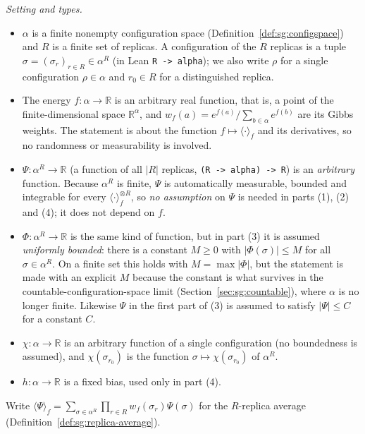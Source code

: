 \begin{lemma}\label{lem:sg:replicacalc}
  \leanok
\emph{Setting and types.}
\begin{itemize}
\item $\alpha$ is a finite nonempty configuration space (Definition~\ref{def:sg:configspace}) and $R$ is a finite set of
  replicas. A configuration of the $R$ replicas is a tuple $\sigma=(\sigma_r)_{r\in R}\in\alpha^R$ (in Lean
  \texttt{R -> alpha}); we also write $\rho$ for a single configuration $\rho\in\alpha$ and $r_0\in R$ for a distinguished replica.
\item The energy $f:\alpha\to\mathbb R$ is an arbitrary real function, that is, a point of the finite-dimensional space
  $\mathbb R^\alpha$, and $w_f(a)=e^{f(a)}/\sum_{b\in\alpha}e^{f(b)}$ are its Gibbs weights. The statement is about the
  function $f\mapsto\langle\cdot\rangle_f$ and its derivatives, so no randomness or measurability is involved.
\item $\Psi:\alpha^R\to\mathbb R$ (a function of all $|R|$ replicas, \texttt{(R -> alpha) -> R}) is an \emph{arbitrary} function.
  Because $\alpha^R$ is finite, $\Psi$ is automatically measurable, bounded and integrable for every
  $\langle\cdot\rangle_f^{\otimes R}$, so \emph{no assumption} on $\Psi$ is needed in parts (1), (2) and (4); it does not
  depend on $f$.
\item $\Phi:\alpha^R\to\mathbb R$ is the same kind of function, but in part (3) it is assumed \emph{uniformly bounded}: there
  is a constant $M\ge0$ with $|\Phi(\sigma)|\le M$ for all $\sigma\in\alpha^R$. On a finite set this holds with
  $M=\max|\Phi|$, but the statement is made with an explicit $M$ because the constant is what survives in the
  countable-configuration-space limit (Section~\ref{sec:sg:countable}), where $\alpha$ is no longer finite.
  Likewise $\Psi$ in the first part of (3) is assumed to satisfy $|\Psi|\le C$ for a constant $C$.
\item $\chi:\alpha\to\mathbb R$ is an arbitrary function of a single configuration (no boundedness is assumed), and
  $\chi(\sigma_{r_0})$ is the function $\sigma\mapsto\chi(\sigma_{r_0})$ of $\alpha^R$.
\item $h:\alpha\to\mathbb R$ is a fixed bias, used only in part (4).
\end{itemize}
Write $\langle\Psi\rangle_f=\sum_{\sigma\in\alpha^R}\prod_{r\in R}w_f(\sigma_r)\Psi(\sigma)$ for the $R$-replica average
(Definition~\ref{def:sg:replica-average}).


\end{lemma}
